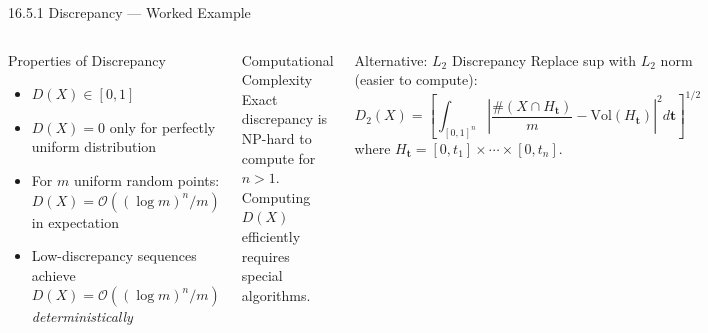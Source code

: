 \documentclass[aspectratio=169,10pt]{beamer}
\begin{document}
\begin{frame}[allowframebreaks]{16.5.1 Discrepancy --- Worked Example}
  \framebreak

  \begin{columns}
    \begin{block}{Properties of Discrepancy}
      \begin{itemize}
        \item $D(X) \in [0, 1]$
        \item $D(X) = 0$ only for perfectly uniform distribution
        \item For $m$ uniform random points:
              $D(X) = \mathcal{O}((\log m)^n / m)$ in expectation
        \item Low-discrepancy sequences achieve
              $D(X) = \mathcal{O}((\log m)^n / m)$ \emph{deterministically}
      \end{itemize}
    \end{block}
    \begin{alertblock}{Computational Complexity}
      Exact discrepancy is NP-hard to compute for $n > 1$.
      Computing $D(X)$ efficiently requires special algorithms.
    \end{alertblock}

    \begin{block}{Alternative: $L_2$ Discrepancy}
      Replace sup with $L_2$ norm (easier to compute):
      \[
        D_2(X) = \left[\int_{[0,1]^n}
          \left|\frac{\#(X\cap H_\mathbf{t})}{m} - \mathrm{Vol}(H_\mathbf{t})\right|^2
          d\mathbf{t}\right]^{1/2}
      \]
      where $H_\mathbf{t} = [0,t_1]\times\cdots\times[0,t_n]$.
    \end{block}
  \end{columns}
\end{frame}
\end{document}

